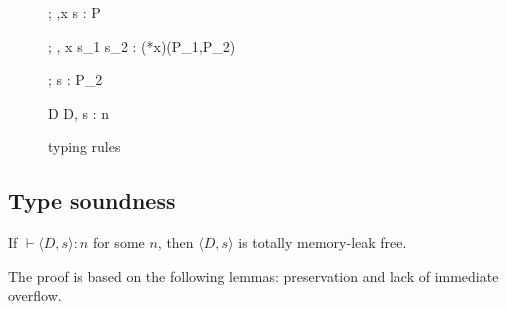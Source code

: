 \begin{figure}
\begin{minipage}{\textwidth}
{\Theta ; \Gamma,x \vdash \scon\Sirx s : \scon\Sirx P}


{\Theta ; \Gamma, x \vdash \IFNULL\Sirx \; \THEN s_{1}\; \ELSE s_{2} : (*x)(P_1,P_2)}


{\Theta ; \Gamma \vdash s : P_{2}}

        {\vdash D \COL \Theta}
{\vdash \langle D, s \rangle : n}

\end{minipage}
\caption{typing rules}
\label{fig:TypingRules}
\end{figure}

\subsection{Type soundness}
\begin{theorem}\label{thm1}
If $\vdash \langle D, s \rangle : n$ for some \(n\), then \(\langle D,
s \rangle\) is totally memory-leak free.
\end{theorem}

The proof is based on the following lemmas: preservation and lack of
immediate overflow.


